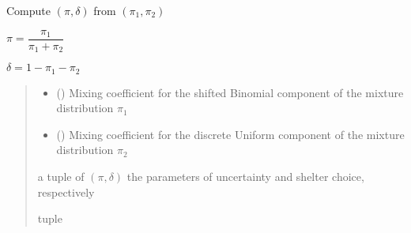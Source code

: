 \documentclass[letterpaper,10pt,english]{sphinxmanual}
\begin{document}
\begin{fulllineitems}
\label{\detokenize{cubmods:cubmods.cubsh.pi1pi2_to_pidelta}}
\pysigstartsignatures
{}
\pysigstopsignatures
\sphinxAtStartPar
Compute \((\pi, \delta)\) from \((\pi_1, \pi_2)\)

\sphinxAtStartPar
\(\pi = \dfrac{\pi_1}{\pi_1 + \pi_2}\)

\sphinxAtStartPar
\(\delta = 1 - \pi_1 - \pi_2\)
\begin{quote}\begin{description}
\begin{itemize}
\item {} 
\sphinxAtStartPar
{} () \textendash{} Mixing coefficient for the shifted Binomial component of the mixture distribution \(\pi_1\)

\item {} 
\sphinxAtStartPar
{} () \textendash{} Mixing coefficient for the discrete Uniform component of the mixture distribution \(\pi_2\)

\end{itemize}

\sphinxAtStartPar
a tuple of \((\pi, \delta)\) the parameters of 
uncertainty and shelter choice, respectively

\sphinxAtStartPar
tuple

\end{description}\end{quote}

\end{fulllineitems}

\end{document}
